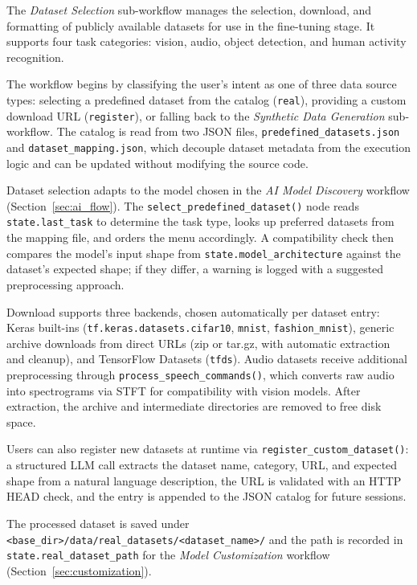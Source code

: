 The \textit{Dataset Selection} sub-workflow manages the selection, download, and formatting of publicly available datasets for use in the fine-tuning stage. It supports four task categories: vision, audio, object detection, and human activity recognition.

The workflow begins by classifying the user's intent as one of three data source types: selecting a predefined dataset from the catalog (\texttt{real}), providing a custom download URL (\texttt{register}), or falling back to the \textit{Synthetic Data Generation} sub-workflow. The catalog is read from two JSON files, \texttt{predefined\_datasets.json} and \texttt{dataset\_mapping.json}, which decouple dataset metadata from the execution logic and can be updated without modifying the source code.

Dataset selection adapts to the model chosen in the \textit{AI Model Discovery} workflow (Section~\ref{sec:ai_flow}). The \texttt{select\_\allowbreak predefined\_\allowbreak dataset()} node reads \texttt{state.last\_task} to determine the task type, looks up preferred datasets from the mapping file, and orders the menu accordingly. A compatibility check then compares the model's input shape from \texttt{state.model\_architecture} against the dataset's expected shape; if they differ, a warning is logged with a suggested preprocessing approach.

Download supports three backends, chosen automatically per dataset entry: Keras built-ins (\texttt{tf.keras.datasets.cifar10}, \texttt{mnist}, \texttt{fashion\_mnist}), generic archive downloads from direct URLs (zip or tar.gz, with automatic extraction and cleanup), and TensorFlow Datasets (\texttt{tfds}). Audio datasets receive additional preprocessing through \texttt{process\_\allowbreak speech\_\allowbreak commands()}, which converts raw audio into spectrograms via STFT for compatibility with vision models. After extraction, the archive and intermediate directories are removed to free disk space.

Users can also register new datasets at runtime via \texttt{register\_\allowbreak custom\_\allowbreak dataset()}: a structured LLM call extracts the dataset name, category, URL, and expected shape from a natural language description, the URL is validated with an HTTP HEAD check, and the entry is appended to the JSON catalog for future sessions.

The processed dataset is saved under \texttt{\textless base\_\allowbreak dir\textgreater/data/real\_\allowbreak datasets/\textless dataset\_\allowbreak name\textgreater/} and the path is recorded in \texttt{state.real\_\allowbreak dataset\_\allowbreak path} for the \textit{Model Customization} workflow (Section~\ref{sec:customization}).
